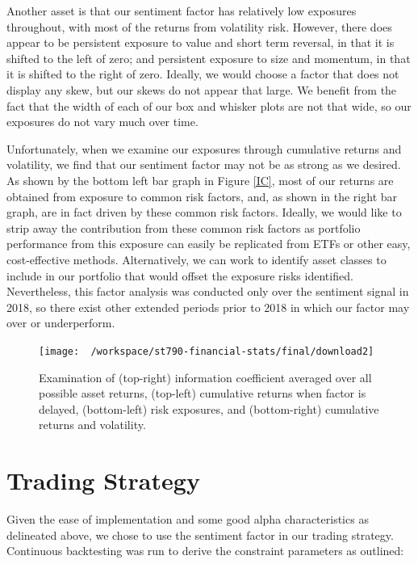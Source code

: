 \documentclass[11,]{article}
\begin{document}
Another asset is that our sentiment factor has relatively low exposures
throughout, with most of the returns from volatility risk. However,
there does appear to be persistent exposure to value and short term
reversal, in that it is shifted to the left of zero; and persistent
exposure to size and momentum, in that it is shifted to the right of
zero. Ideally, we would choose a factor that does not display any skew,
but our skews do not appear that large. We benefit from the fact that
the width of each of our box and whisker plots are not that wide, so our
exposures do not vary much over time.

Unfortunately, when we examine our exposures through cumulative returns
and volatility, we find that our sentiment factor may not be as strong
as we desired. As shown by the bottom left bar graph in Figure \ref{IC},
most of our returns are obtained from exposure to common risk factors,
and, as shown in the right bar graph, are in fact driven by these common
risk factors. Ideally, we would like to strip away the contribution from
these common risk factors as portfolio performance from this exposure
can easily be replicated from ETFs or other easy, cost-effective
methods. Alternatively, we can work to identify asset classes to include
in our portfolio that would offset the exposure risks identified.
Nevertheless, this factor analysis was conducted only over the sentiment
signal in 2018, so there exist other extended periods prior to 2018 in
which our factor may over or underperform.

\begin{figure}

{\centering \texttt{[image: ~/workspace/st790-financial-stats/final/download2]} 

}

\caption{\label{IC}Examination of (top-right) information coefficient averaged over all possible asset returns, (top-left) cumulative returns when factor is delayed, (bottom-left) risk exposures, and (bottom-right) cumulative returns and volatility.}\label{fig:unnamed-chunk-3}
\end{figure}

\hypertarget{trading-strategy}{%
\section{Trading Strategy}\label{trading-strategy}}

Given the ease of implementation and some good alpha characteristics as
delineated above, we chose to use the sentiment factor in our trading
strategy. Continuous backtesting was run to derive the constraint
parameters as outlined:
\end{document}
